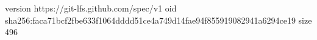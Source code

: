 version https://git-lfs.github.com/spec/v1
oid sha256:faca71bcf2fbe633f1064dddd51ce4a749d14fae94f855919082941a6294ce19
size 496
